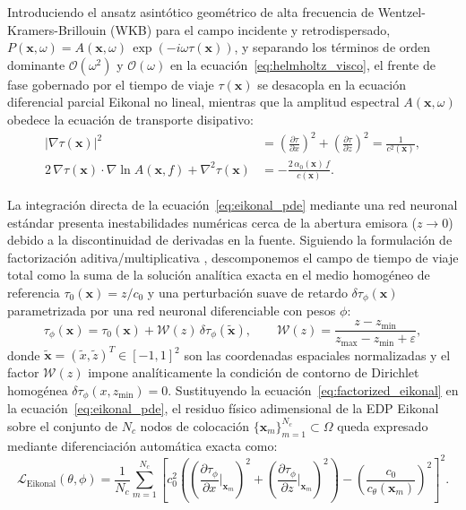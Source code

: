 \documentclass[9pt]{article}
\begin{document}
Introduciendo el ansatz asintótico geométrico de alta frecuencia de Wentzel-Kramers-Brillouin (WKB) para el campo incidente y retrodispersado, $P(\mathbf{x}, \omega) = A(\mathbf{x}, \omega)\,\exp\!\left(-i\omega\tau(\mathbf{x})\right)$, y separando los términos de orden dominante $\mathcal{O}(\omega^2)$ y $\mathcal{O}(\omega)$ en la ecuación~\eqref{eq:helmholtz_visco}, el frente de fase gobernado por el tiempo de viaje $\tau(\mathbf{x})$ se desacopla en la ecuación diferencial parcial Eikonal no lineal, mientras que la amplitud espectral $A(\mathbf{x}, \omega)$ obedece la ecuación de transporte disipativo:
\begin{align}
\lvert\nabla\tau(\mathbf{x})\rvert^2 &= \left(\frac{\partial\tau}{\partial x}\right)^2 + \left(\frac{\partial\tau}{\partial z}\right)^2 = \frac{1}{c^2(\mathbf{x})}, \label{eq:eikonal_pde}\\
2\,\nabla\tau(\mathbf{x})\cdot\nabla\ln A(\mathbf{x}, f) + \nabla^2\tau(\mathbf{x}) &= -\frac{2\,\alpha_0(\mathbf{x})\,f}{c(\mathbf{x})}. \label{eq:transport_pde}
\end{align}

La integración directa de la ecuación~\eqref{eq:eikonal_pde} mediante una red neuronal estándar presenta inestabilidades numéricas cerca de la abertura emisora ($z \to 0$) debido a la discontinuidad de derivadas en la fuente. Siguiendo la formulación de factorización aditiva/multiplicativa \parencite{Fomel2009, Waheed2021}, descomponemos el campo de tiempo de viaje total como la suma de la solución analítica exacta en el medio homogéneo de referencia $\tau_0(\mathbf{x}) = z / c_0$ y una perturbación suave de retardo $\delta\tau_\phi(\mathbf{x})$ parametrizada por una red neuronal diferenciable con pesos $\phi$:
\begin{equation}
\tau_\phi(\mathbf{x}) = \tau_0(\mathbf{x}) + \mathcal{W}(z)\,\delta\tau_\phi(\tilde{\mathbf{x}}), \qquad \mathcal{W}(z) = \frac{z - z_{\min}}{z_{\max} - z_{\min} + \varepsilon},
\label{eq:factorized_eikonal}
\end{equation}
donde $\tilde{\mathbf{x}} = (\tilde{x}, \tilde{z})^T \in [-1, 1]^2$ son las coordenadas espaciales normalizadas y el factor $\mathcal{W}(z)$ impone analíticamente la condición de contorno de Dirichlet homogénea $\delta\tau_\phi(x, z_{\min}) = 0$. Sustituyendo la ecuación~\eqref{eq:factorized_eikonal} en la ecuación~\eqref{eq:eikonal_pde}, el residuo físico adimensional de la EDP Eikonal sobre el conjunto de $N_c$ nodos de colocación $\{\mathbf{x}_m\}_{m=1}^{N_c} \subset \Omega$ queda expresado mediante diferenciación automática exacta como:
\begin{equation}
\mathcal{L}_{\text{Eikonal}}(\theta, \phi) = \frac{1}{N_c}\sum_{m=1}^{N_c}\left[c_0^2\left(\left(\frac{\partial\tau_\phi}{\partial x}\Big|_{\mathbf{x}_m}\right)^2 + \left(\frac{\partial\tau_\phi}{\partial z}\Big|_{\mathbf{x}_m}\right)^2\right) - \left(\frac{c_0}{c_\theta(\mathbf{x}_m)}\right)^2\right]^2.
\label{eq:loss_eikonal}
\end{equation}
\end{document}
